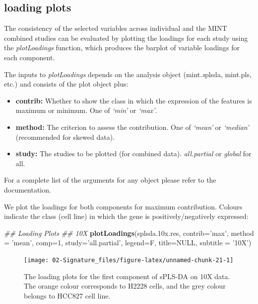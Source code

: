 \documentclass[]{book}
\newenvironment{Shaded}{\begin{snugshade}}{\end{snugshade}}
\newcommand{\CommentTok}[1]{\textcolor[rgb]{0.56,0.35,0.01}{\textit{#1}}}
\newcommand{\DataTypeTok}[1]{\textcolor[rgb]{0.13,0.29,0.53}{#1}}
\newcommand{\DecValTok}[1]{\textcolor[rgb]{0.00,0.00,0.81}{#1}}
\newcommand{\FloatTok}[1]{\textcolor[rgb]{0.00,0.00,0.81}{#1}}
\newcommand{\KeywordTok}[1]{\textcolor[rgb]{0.13,0.29,0.53}{\textbf{#1}}}
\newcommand{\NormalTok}[1]{#1}
\newcommand{\OtherTok}[1]{\textcolor[rgb]{0.56,0.35,0.01}{#1}}
\newcommand{\StringTok}[1]{\textcolor[rgb]{0.31,0.60,0.02}{#1}}
\providecommand{\tightlist}{%
  \setlength{\itemsep}{0pt}\setlength{\parskip}{0pt}}
\theoremstyle{definition}
\theoremstyle{definition}
\theoremstyle{definition}
\theoremstyle{remark}
\begin{document}
\hypertarget{loading-plots}{%
\subsection{loading plots}\label{loading-plots}}

The consistency of the selected variables across individual and the MINT
combined studies can be evaluated by plotting the loadings for each
study using the \emph{plotLoadings} function, which produces the barplot
of variable loadings for each component.

The inputs to \emph{plotLoadings} depends on the analysis object
(mint.\emph{s}plsda, mint.pls, etc.) and consists of the plot object
plus:

\begin{itemize}
\tightlist
\item
  \textbf{contrib:} Whether to show the class in which the expression of
  the features is maximum or minimum. One of \emph{`min'} or
  \emph{`max'}.
\item
  \textbf{method:} The criterion to assess the contribution. One of
  \emph{`mean'} or \emph{`median'} (recommended for skewed data).
\item
  \textbf{study:} The studies to be plotted (for combined data).
  \emph{all.partial} or \emph{global} for all.
\end{itemize}

For a complete list of the arguments for any object please refer to the
documentation.

We plot the loadings for both components for maximum contribution.
Colours indicate the class (cell line) in which the gene is
positively/negatively expressed:

\begin{Shaded}
\begin{Highlighting}[]
\CommentTok{## Loading Plots}
\CommentTok{## 10X}
\KeywordTok{plotLoadings}\NormalTok{(splsda}\FloatTok{.10}\NormalTok{x.res, }\DataTypeTok{contrib=}\StringTok{'max'}\NormalTok{, }\DataTypeTok{method =} \StringTok{'mean'}\NormalTok{, }\DataTypeTok{comp=}\DecValTok{1}\NormalTok{, }
             \DataTypeTok{study=}\StringTok{'all.partial'}\NormalTok{, }\DataTypeTok{legend=}\NormalTok{F, }\DataTypeTok{title=}\OtherTok{NULL}\NormalTok{, }
             \DataTypeTok{subtitle =} \StringTok{'10X'}\NormalTok{)}
\end{Highlighting}
\end{Shaded}

\begin{figure}[ht]

{\centering \texttt{[image: 02-Signature\_files/figure-latex/unnamed-chunk-21-1]} 

}

\caption{The loading plots for the first component of sPLS-DA on 10X data. The orange colour corresponds to H2228 cells, and the grey colour belongs to HCC827 cell line.}\label{fig:unnamed-chunk-21}
\end{figure}
\end{document}
